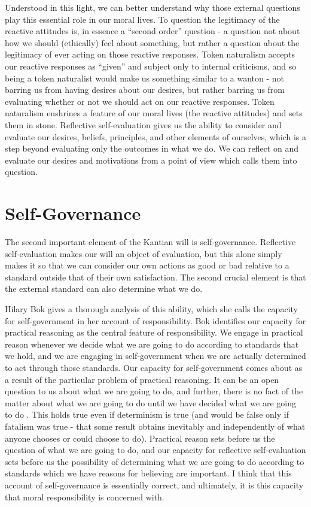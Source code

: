 \documentclass[phd,12pt,oneside,paper=letterpaper]{ubcthesis}
\begin{document}
{Understood in this light, we can better understand why those external questions play this essential role in our moral lives. To question the legitimacy of the reactive attitudes is, in essence a ``second order'' question - a question not about how we should (ethically) feel about something, but rather a question about the legitimacy of ever acting on those reactive responses. Token naturalism accepts our reactive responses as ``given'' and subject only to internal criticisms, and so being a token naturalist would make us something similar to a wanton - not barring us from having desires about our desires, but rather barring us from evaluating whether or not we should act on our reactive responses. Token naturalism enshrines a feature of our moral lives (the reactive attitudes) and sets them in stone. Reflective self-evaluation gives us the ability to consider and evaluate our desires, beliefs, principles, and other elements of ourselves, which is a step beyond evaluating only the outcomes in what we do.  We can reflect on and evaluate our desires and motivations from a point of view which calls them into question.}

\section{Self-Governance}
The second important element of the Kantian will is self-governance. Reflective self-evaluation makes our will an object of evaluation, but this alone simply makes it so that we can consider our own actions as good or bad relative to a standard outside that of their own satisfaction. The second crucial element is that the external standard can also determine what we do.

Hilary Bok gives a thorough analysis of this ability, which she calls the capacity for self-government in her account of responsibility. Bok identifies our capacity for practical reasoning as the central feature of responsibility. We engage in practical reason whenever we decide what we are going to do according to standards that we hold, and we are engaging in self-government when we are actually determined to act through those standards. Our capacity for self-government comes about as a result of the particular problem of practical reasoning. It can be an open question to us about what we are going to do, and further, there is no fact of the matter about what we are going to do until we have decided what we are going to do \citep[p.105-6]{bok1998}. This holds true even if determinism is true (and would be false only if fatalism was true - that some result obtains inevitably and independently of what anyone chooses or could choose to do). Practical reason sets before us the question of what we are going to do, and our capacity for reflective self-evaluation sets before us the possibility of determining what we are going to do according to standards which we have reasons for believing are important. I think that this account of self-governance is essentially correct, and ultimately, it is this capacity that moral responsibility is concerned with.
\end{document}
